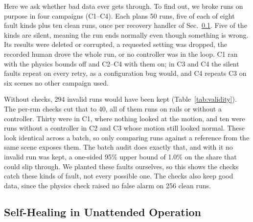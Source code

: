 \documentclass[conference]{IEEEtran}
\newcommand{\guide}[1]{}
\begin{document}
Here we ask whether bad data ever gets through. To find out, we broke runs on purpose in four campaigns (C1--C4). Each plans 50 runs, five of each of eight fault kinds plus ten clean runs, once per recovery handler of Sec.~\ref{sec:healing}. Five of the kinds are silent, meaning the run ends normally even though something is wrong. Its results were deleted or corrupted, a requested setting was dropped, the recorded human drove the whole run, or no controller was in the loop. C1 ran with the physics bounds off and C2--C4 with them on; in C3 and C4 the silent faults repeat on every retry, as a configuration bug would, and C4 repeats C3 on six scenes no other campaign used.

Without checks, 294 invalid runs would have been kept (Table~\ref{tab:validity}). The per-run checks cut that to 40, all of them runs on rails or without a controller. Thirty were in C1, where nothing looked at the motion, and ten were runs without a controller in C2 and C3 whose motion still looked normal. These look identical across a batch, so only comparing runs against a reference from the same scene exposes them. The batch audit does exactly that, and with it no invalid run was kept, a one-sided 95\% upper bound of 1.0\% on the share that could slip through. We planted these faults ourselves, so this shows the checks catch these kinds of fault, not every possible one. The checks also keep good data, since the physics check raised no false alarm on 256 clean runs.


\subsection{Self-Healing in Unattended Operation}\label{sec:healing}
\guide{Test whether the agent keeps a long campaign running without a person, using every failed launch of the whole campaign. (1) Scale and outcome: runs asked for, runs kept on the first try, launches that failed and went to the agent, and how many of those were healed or stopped for a person (Fig.~\ref{fig:healing}). (2) What the agent chose: for each kind of failure, the skill it picked and how the run ended; every answer passed the validator, and every retry ran exactly the settings asked for. (3) Honest accounting: most heals are out-of-memory crashes answered by a plain rerun, which a retry script would also do; the agent's value is in the rest, such as halting runs that failed the physics check instead of rerunning them and clearing a machine that was not ready. (4) Against a retry script: on the planted-fault campaigns, the same faults handled by a fixed script, by the agent without tools, and by the agent with read-only tools; compare valid runs kept, launches used and runs stopped, and note where the agent without tools fails (results missing despite a normal exit). Report the agent's time per decision. \emph{Regenerate Fig.~\ref{fig:healing} from the final data before submission. Give (4) as a few numbers in the text, or a small table if space allows.}}
\end{document}

